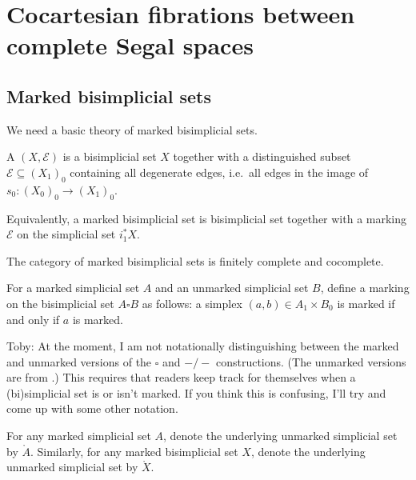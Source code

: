 \documentclass[main.tex]{subfiles}
\begin{document}
\section{Cocartesian fibrations between complete Segal spaces}
\label{sec:cocartesian_fibrations_between_complete_segal_spaces}

\subsection{Marked bisimplicial sets}
\label{ssc:marked_bisimplicial_sets}


We need a basic theory of marked bisimplicial sets.

\begin{definition}
  A  $(X, \mathcal{E})$ is a bisimplicial set $X$ together with a distinguished subset $\mathcal{E} \subseteq (X_{1})_{0}$ containing all degenerate edges, i.e.\ all edges in the image of $s_{0}\colon (X_{0})_{0} \to (X_{1})_{0}$.
\end{definition}
Equivalently, a marked bisimplicial set is bisimplicial set together with a marking $\mathcal{E}$ on the simplicial set $i^{*}_{1}X$.

The category of marked bisimplicial sets is finitely complete and cocomplete.

\begin{definition}
  For a marked simplicial set $A$ and an unmarked simplicial set $B$, define a marking on the bisimplicial set $A \square B$ as follows: a simplex $(a, b) \in A_{1} \times B_{0}$ is marked if and only if $a$ is marked.
\end{definition}

\begin{note}
  Toby: At the moment, I am not notationally distinguishing between the marked and unmarked versions of the $\square$ and $-/-$ constructions. (The unmarked versions are from \cite{qcats_vs_segal_spaces}.) This requires that readers keep track for themselves when a (bi)simplicial set is or isn't marked. If you think this is confusing, I'll try and come up with some other notation.
\end{note}

For any marked simplicial set $A$, denote the underlying unmarked simplicial set by $\mathring{A}$. Similarly, for any marked bisimplicial set $X$, denote the underlying unmarked simplicial set by $\mathring{X}$.
\end{document}
